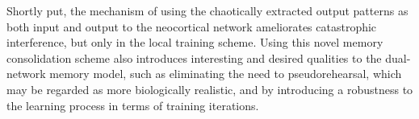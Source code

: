 Shortly put, the mechanism of using the chaotically extracted output patterns as both input and output to the neocortical network ameliorates catastrophic interference, but only in the local training scheme. Using this novel memory consolidation scheme also introduces interesting and desired qualities to the dual-network memory model, such as eliminating the need to pseudorehearsal, which may be regarded as more biologically realistic, and by introducing a robustness to the learning process in terms of training iterations.



